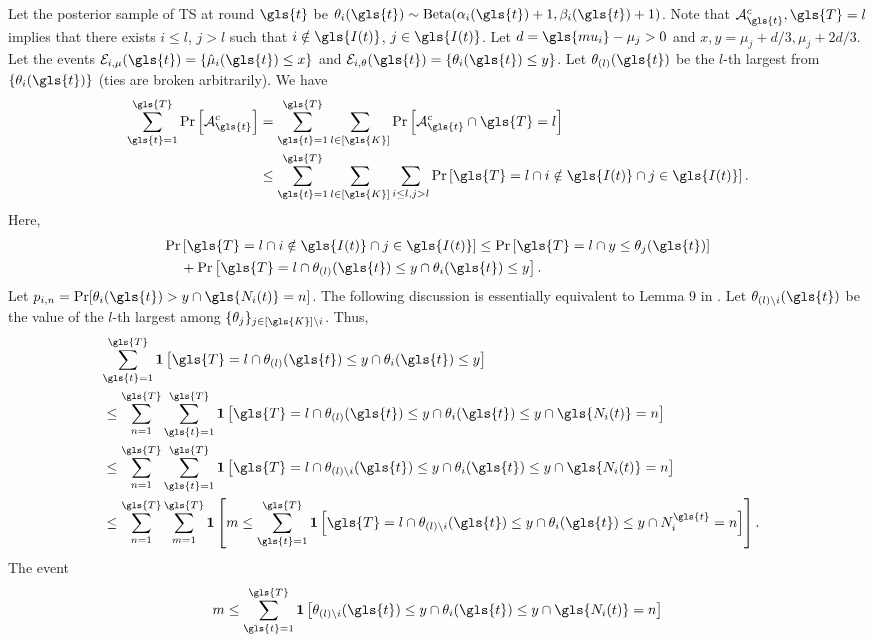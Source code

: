 Let the posterior sample of \gls{TS} at round $\gls{t}$ be $\theta_i(\gls{t}) \sim \text{Beta}(\alpha_i(\gls{t})+1, \beta_i(\gls{t})+1)$.
Note that $\mA^c_{\gls{t}}, {\gls{T}} = l$ implies that there exists $i \le l$, $j > l$ such that $i \notin \gls{I(t)}$, $j \in \gls{I(t)}$.  Let $d = \gls{mu_i} - \mu_j > 0$ and $x, y = \mu_j + d/3, \mu_j + 2d/3$. Let the events $\mE_{i,\mu}(\gls{t}) = \{\hat{\mu}_i(\gls{t}) \le x \}$ and $\mE_{i,\theta}(\gls{t}) = \{\theta_i(\gls{t}) \le y\}$.
Let $\theta_{(l)}(\gls{t})$ be the $l$-th largest from $\{\theta_i(\gls{t})\}$ (ties are broken arbitrarily).
We have
\begin{align}
\sum_{\gls{t}=1}^{\gls{T}} \Pr\left[\mA^c_{\gls{t}}\right] 
&= \sum_{\gls{t}=1}^{\gls{T}} \sum_{l \in [\gls{K}]} \Pr\left[\mA^c_{\gls{t}} \cap {\gls{T}} = l\right] \nn
&\le \sum_{\gls{t}=1}^{\gls{T}} \sum_{l \in [\gls{K}]} \sum_{i \le l, j>l} \Pr\left[{\gls{T}} = l \cap i \notin \gls{I(t)} \cap j \in \gls{I(t)}\right].
\label{ineq_tsmain}
\end{align}
Here,
\begin{align}
\Pr&\left[{\gls{T}} = l \cap i \notin \gls{I(t)} \cap j \in \gls{I(t)}\right] \le \Pr\left[{\gls{T}} = l \cap y \le \theta_j(\gls{t})\right] 
\nn
&+ \Pr\left[{\gls{T}} = l \cap \theta_{(l)}(\gls{t}) \le y \cap \theta_i(\gls{t}) \le y\right].
\label{ineq_tsdecomp}
\end{align}
Let $p_{i,n} = \Pr[\theta_i(\gls{t}) > y \cap \gls{N_i(t)}=n]$.
The following discussion is essentially equivalent to Lemma 9 in \cite{DBLP:conf/icml/KomiyamaHN15}. 
Let $\theta_{(l)\setminus i}(\gls{t})$ be the value of the $l$-th largest among $\{\theta_j\}_{j \in [\gls{K}]\setminus i}$. Thus,
\begin{align*}
\lefteqn{
\sum_{\gls{t}=1}^{\gls{T}} \Ind\left[{\gls{T}} = l \cap \theta_{(l)}(\gls{t}) \le y \cap \theta_i(\gls{t}) \le y\right]
} \nn
&\le \sum_{n=1}^{\gls{T}} \sum_{\gls{t}=1}^{\gls{T}} \Ind\left[{\gls{T}} = l \cap \theta_{(l)}(\gls{t}) \le y \cap \theta_i(\gls{t}) \le y \cap \gls{N_i(t)}=n\right]\nn
&\le \sum_{n=1}^{\gls{T}} \sum_{\gls{t}=1}^{\gls{T}} \Ind\left[{\gls{T}} = l \cap \theta_{(l)\setminus i}(\gls{t}) \le y \cap \theta_i(\gls{t}) \le y \cap \gls{N_i(t)}=n\right]\nn
&\le \sum_{n=1}^{\gls{T}} \sum_{m=1}^{\gls{T}} \Ind\left[m \le \sum_{\gls{t}=1}^{\gls{T}} \Ind\left[{\gls{T}} = l \cap \theta_{(l)\setminus i}(\gls{t}) \le y \cap \theta_i(\gls{t}) \le y \cap N_i^{\gls{t}} =n\right] \right].
\end{align*} 
The event
\begin{equation}\label{ineq_underestm}
m \le \sum_{\gls{t}=1}^{\gls{T}} \Ind\left[\theta_{(l)\setminus i}(\gls{t}) \le y \cap \theta_i(\gls{t}) \le y \cap \gls{N_i(t)}=n\right] 
\end{equation}
